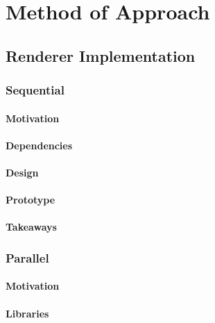%
%
%
\chapter{Method of Approach} \label{ch:methods}

\section{Renderer Implementation}

\subsection{Sequential}

\subsubsection{Motivation}

\subsubsection{Dependencies}

\subsubsection{Design}

\subsubsection{Prototype}

\subsubsection{Takeaways}

\subsection{Parallel}

\subsubsection{Motivation}

\subsubsection{Libraries}

